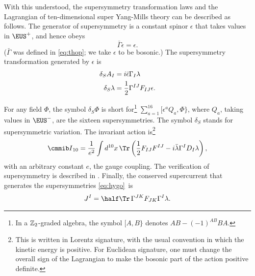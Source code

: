With this understood, the supersymmetry transformation laws and
the Lagrangian of ten-dimensional super Yang-Mills theory can be
described as follows.  The generator of supersymmetry is a
constant spinor $\epsilon$ that takes values in ${\EUS}^+$, and
hence obeys %
\setcounter{equation}{3}
\begin{equation}\label{eq:goggo}
\bar\Gamma\epsilon=\epsilon.
\end{equation}
 ($\bar
\Gamma$ was defined in \eqref{eq:thop}; we take $\epsilon$ to be bosonic.)
The supersymmetry transformation generated by $\epsilon$ is
\setcounter{equation}{4}
\begin{equation}\label{eq:hygo}
\begin{aligned}\delta_S A_I & = i\bar\epsilon\Gamma_I\lambda
\\
                   \delta_S\lambda & = {1\over 2}
                   \Gamma^{IJ}F_{IJ}\epsilon.\\\end{aligned}
\end{equation}

For any field $\Phi$, the symbol $\delta_S \Phi$ is short
for\footnote{In a $\Bbb{Z}_2$-graded algebra, the symbol $[A,B\}$
denotes $AB-(-1)^{AB}BA$.} $\sum_{a=1}^{16}[\epsilon^aQ_a,\Phi\}$,
where $Q_a$, taking values in ${\EUS}^-$, are the sixteen
supersymmetries. The symbol $\delta_S$ stands for supersymmetric
variation. The invariant action is\footnote{This is written in Lorentz
signature, with the usual convention in which the kinetic energy
is positive. For Euclidean signature, one must change the overall
sign of the Lagrangian to make the bosonic part of the action
positive definite.} %
\setcounter{equation}{5}
\begin{equation}\label{eq:ygo}
{{\cmmib I}}_{10}={1\over e^2}\int
d^{10}x\,\Tr\left({1\over
2}F_{IJ}F^{IJ}-i\bar\lambda\Gamma^ID_I\lambda\right),
\end{equation}
 with an
arbitrary constant $e$, the gauge coupling.  The verification of
supersymmetry is described in \cite{ref42}. Finally, the conserved
supercurrent that generates the supersymmetries \eqref{eq:hygo}\ is
\setcounter{equation}{6}
\begin{equation}\label{eq:bygo}
J^I=\half\Tr\, \Gamma^{JK}F_{JK}\Gamma^I\lambda.
\end{equation}

